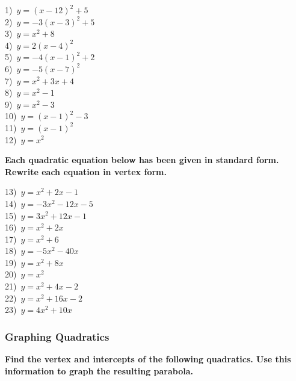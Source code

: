 \documentclass[12pt]{book}
\theoremstyle{definition}
\begin{document}
\begin{multicols}{3}
  1)~$y=(x-12)^2+5$\\
  2)~$y=-3(x-3)^2+5$\\
  3)~$y=x^2+8$\\
  4)~$y=2(x-4)^2 $\\
  5)~$y=-4(x-1)^2+2$\\
  6)~$y=-5(x-7)^2$\\
  7)~$y=x^2+3x+4$\\
  8)~$y=x^2-1$\\
  9)~$y=x^2-3$\\
  10)~$y=(x-1)^2-3 $\\
  11)~$y=(x-1)^2$\\
  12)~$y=x^2$
\end{multicols}

{\bf Each quadratic equation below has been given in standard form.  Rewrite each equation in vertex form.}

\begin{multicols}{3}
  13)~$y=x^2+2x-1 $\\
  14)~$y=-3x^2-12x-5 $\\
  15)~$y=3x^2+12x-1$\\
  16)~$y=x^2+2x$\\
  17)~$y=x^2+6$\\
  18)~$y=-5x^2-40x$\\
  19)~$y=x^2+8x$\\
  20)~$y=x^2$\\
  21)~$y=x^2+4x-2$\\
  22)~$y=x^2+16x-2$\\
  23)~$y=4x^2+10x$\\
\end{multicols}

\newpage
\subsubsection{Graphing Quadratics}

{\bf Find the vertex and intercepts of the following quadratics. Use this information to graph the resulting parabola.}
\end{document}
